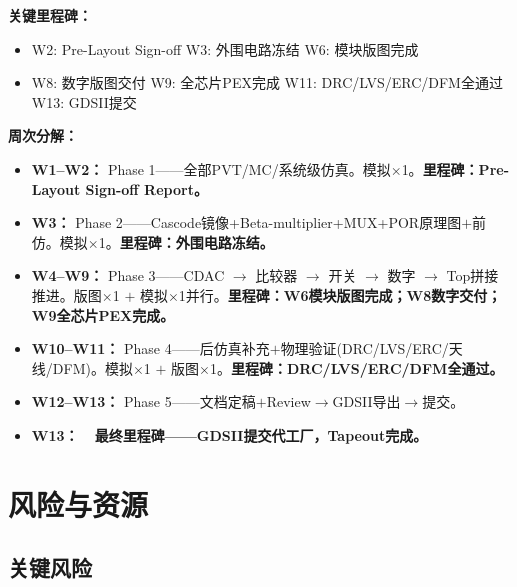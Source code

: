 \documentclass[12pt,a4paper,fontset=none]{ctexart}
\newcommand{\needtable}{\needspace{6cm}}   %
\begin{document}
\vspace{0.3cm}
\textbf{关键里程碑：}
\begin{itemize}[leftmargin=*,nosep]
    \item W2: Pre-Layout Sign-off \quad W3: 外围电路冻结 \quad W6: 模块版图完成
    \item W8: 数字版图交付 \quad W9: 全芯片PEX完成 \quad W11: DRC/LVS/ERC/DFM全通过 \quad W13: GDSII提交
\end{itemize}

\vspace{0.5cm}

\textbf{周次分解：}

\begin{itemize}[leftmargin=*,nosep]
    \item \textbf{W1--W2：} Phase 1——全部PVT/MC/系统级仿真。模拟$\times$1。\textbf{里程碑：Pre-Layout Sign-off Report。}
    \item \textbf{W3：} Phase 2——Cascode镜像+Beta-multiplier+MUX+POR原理图$+$前仿。模拟$\times$1。\textbf{里程碑：外围电路冻结。}
    \item \textbf{W4--W9：} Phase 3——CDAC $\to$ 比较器 $\to$ 开关 $\to$ 数字 $\to$ Top拼接推进。版图$\times$1 $+$ 模拟$\times$1并行。\textbf{里程碑：W6模块版图完成；W8数字交付；W9全芯片PEX完成。}
    \item \textbf{W10--W11：} Phase 4——后仿真补充$+$物理验证(DRC/LVS/ERC/天线/DFM)。模拟$\times$1 $+$ 版图$\times$1。\textbf{里程碑：DRC/LVS/ERC/DFM全通过。}
    \item \textbf{W12--W13：} Phase 5——文档定稿$+$Review$\to$GDSII导出$\to$提交。
    \item \textbf{W13：\ \ 最终里程碑——GDSII提交代工厂，Tapeout完成。}
\end{itemize}

\newpage
\section{风险与资源}

\needtable
\subsection{关键风险}
\end{document}
